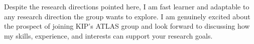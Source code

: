 \documentclass[11pt, a4paper]{awesome-cv}
\begin{document}
\begin{cvletter}
Despite the research directions pointed here, I am fast learner and adaptable to any research direction the group wants to explore. I am genuinely excited about the prospect of joining KIP's ATLAS group and look forward to discussing how my skills, experience, and interests can support your research goals.

\end{cvletter}


\makeletterclosing
\end{document}

